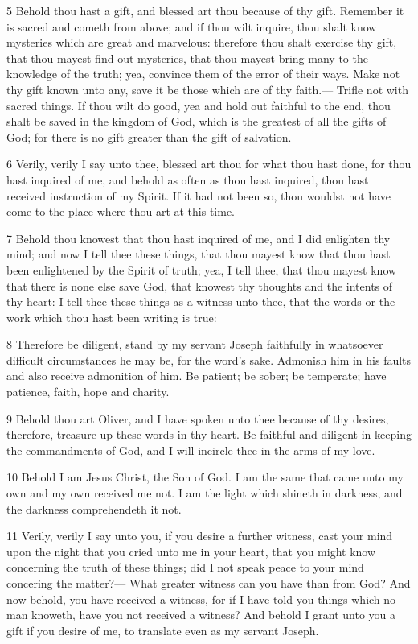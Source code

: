 				5 Behold thou hast a gift, and blessed art thou because of thy gift. Remember it is sacred and cometh from above; and if thou wilt inquire, thou shalt know mysteries which are great and marvelous: therefore thou shalt exercise thy gift, that thou mayest find out mysteries, that thou mayest bring many to the knowledge of the truth; yea, convince them of the error of their ways. Make not thy gift known unto any, save it be those which are of thy faith.--- Trifle not with sacred things. If thou wilt do good, yea and hold out faithful to the end, thou shalt be saved in the kingdom of God, which is the greatest of all the gifts of God; for there is no gift greater than the gift of salvation.

				6 Verily, verily I say unto thee, blessed art thou for what thou hast done, for thou hast inquired of me, and behold as often as thou hast inquired, thou hast received instruction of my Spirit. If it had not been so, thou wouldst not have come to the place where thou art at this time.

				7 Behold thou knowest that thou hast inquired of me, and I did enlighten thy mind; and now I tell thee these things, that thou mayest know that thou hast been enlightened by the Spirit of truth; yea, I tell thee, that thou mayest know that there is none else save God, that knowest thy thoughts and the intents of thy heart: I tell thee these things as a witness unto thee, that the words or the work which thou hast been writing is true:

				8 Therefore be diligent, stand by my servant Joseph faithfully in whatsoever difficult circumstances he may be, for the word's sake. Admonish him in his faults and also receive admonition of him. Be patient; be sober; be temperate; have patience, faith, hope and charity.

				9 Behold thou art Oliver, and I have spoken unto thee because of thy desires, therefore, treasure up these words in thy heart. Be faithful and diligent in keeping the commandments of God, and I will incircle thee in the arms of my love.

				10 Behold I am Jesus Christ, the Son of God. I am the same that came unto my own and my own received me not. I am the light which shineth in darkness, and the darkness comprehendeth it not.

				11 Verily, verily I say unto you, if you desire a further witness, cast your mind upon the night that you cried unto me in your heart, that you might know concerning the truth of these things; did I not speak peace to your mind concering the matter?--- What greater witness can you have than from God? And now behold, you have received a witness, for if I have told you things which no man knoweth, have you not received a witness? And behold I grant unto you a gift if you desire of me, to translate even as my servant Joseph.

